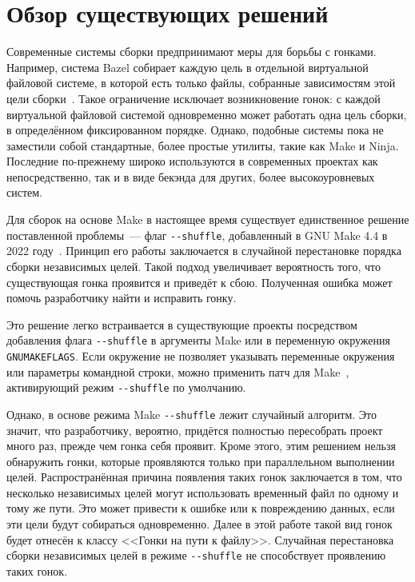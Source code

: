 \section{Обзор существующих решений}
\label{sec:Chapter2} 


Современные системы сборки предпринимают меры для борьбы с гонками. Например, система Bazel собирает каждую цель в отдельной виртуальной файловой системе, в которой есть только файлы, собранные зависимостям этой цели сборки~\cite{bazel-sandbox}. Такое ограничение исключает возникновение гонок: с каждой виртуальной файловой системой одновременно может работать одна цель сборки, в определённом фиксированном порядке. Однако, подобные системы пока не заместили собой стандартные, более простые утилиты, такие как Make и Ninja. Последние по-прежнему широко используются в современных проектах как непосредственно, так и в виде бекэнда для других, более высокоуровневых систем.

Для сборок на основе Make в настоящее время существует единственное решение поставленной проблемы~--- флаг \texttt{-{}-shuffle}, добавленный в GNU Make 4.4 в 2022 году~\cite{trofi-make-shuffle}. Принцип его работы заключается в случайной перестановке порядка сборки независимых целей. Такой подход увеличивает вероятность того, что существующая гонка проявится и приведёт к сбою. Полученная ошибка может помочь разработчику найти и исправить гонку.

Это решение легко встраивается в существующие проекты посредством добавления флага \texttt{-{}-shuffle} в аргументы Make или в переменную окружения \texttt{GNUMAKEFLAGS}. Если окружение не позволяет указывать переменные окружения или параметры командной строки, можно применить патч для Make~\cite{make-shuffle-patch}, активирующий режим \texttt{-{}-shuffle} по умолчанию.

Однако, в основе режима Make \texttt{-{}-shuffle} лежит случайный алгоритм. Это значит, что разработчику, вероятно, придётся полностью пересобрать проект много раз, прежде чем гонка себя проявит. Кроме этого, этим решением нельзя обнаружить гонки, которые проявляются только при параллельном выполнении целей. Распространённая причина появления таких гонок заключается в том, что несколько независимых целей могут использовать временный файл по одному и тому же пути. Это может привести к ошибке или к повреждению данных, если эти цели будут собираться одновременно. Далее в этой работе такой вид гонок будет отнесён к классу <<Гонки на пути к файлу>>. Случайная перестановка сборки независимых целей в режиме \texttt{-{}-shuffle} не способствует проявлению таких гонок.